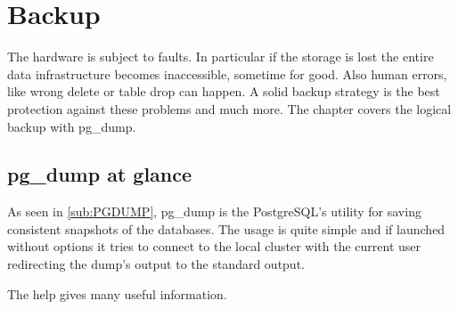 \chapter{Backup}
\label{cha:BACKUP}
The hardware is subject to faults. In particular if the storage is lost the entire data 
infrastructure becomes inaccessible, sometime for good. Also human errors, like wrong delete or table drop 
can happen. A solid backup strategy is the best protection against these problems and much more. The 
chapter covers the logical backup with pg\_dump. 

\section{pg\_dump at glance}
\label{sec:PGDUMP}
As seen in \ref{sub:PGDUMP}, pg\_dump is the PostgreSQL's utility for saving 
consistent snapshots of the databases. The usage is quite simple and if launched without options it tries 
to connect to the local cluster with the current user redirecting the dump's output to the standard 
output.\newline

The help gives many useful information.

